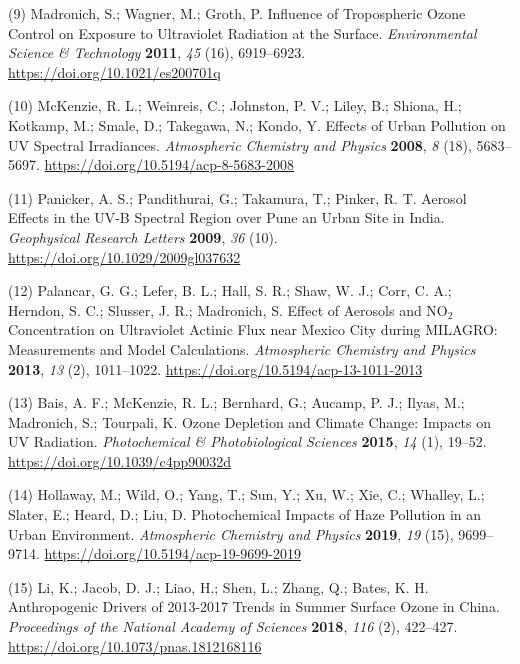 \documentclass[10pt]{article}
\begin{document}
\label{csl:9}(9) Madronich, S.; Wagner, M.; Groth, P. {Influence of Tropospheric Ozone Control on Exposure to Ultraviolet Radiation at the Surface}. \textit{Environmental Science {\&} Technology} \textbf{2011}, \textit{45} (16), 6919–6923. \url{https://doi.org/10.1021/es200701q}

\label{csl:10}(10) McKenzie, R. L.; Weinreis, C.; Johnston, P. V.; Liley, B.; Shiona, H.; Kotkamp, M.; Smale, D.; Takegawa, N.; Kondo, Y. {Effects of Urban Pollution on {UV} Spectral Irradiances}. \textit{Atmospheric Chemistry and Physics} \textbf{2008}, \textit{8} (18), 5683–5697. \url{https://doi.org/10.5194/acp-8-5683-2008}

\label{csl:11}(11) Panicker, A. S.; Pandithurai, G.; Takamura, T.; Pinker, R. T. {Aerosol Effects in the {UV}-B Spectral Region over Pune an Urban Site in India}. \textit{Geophysical Research Letters} \textbf{2009}, \textit{36} (10). \url{https://doi.org/10.1029/2009gl037632}

\label{csl:12}(12) Palancar, G. G.; Lefer, B. L.; Hall, S. R.; Shaw, W. J.; Corr, C. A.; Herndon, S. C.; Slusser, J. R.; Madronich, S. {Effect of Aerosols and NO$_{2}$ Concentration on Ultraviolet Actinic Flux near Mexico City during MILAGRO: Measurements and Model Calculations}. \textit{Atmospheric Chemistry and Physics} \textbf{2013}, \textit{13} (2), 1011–1022. \url{https://doi.org/10.5194/acp-13-1011-2013}

\label{csl:13}(13) Bais, A. F.; McKenzie, R. L.; Bernhard, G.; Aucamp, P. J.; Ilyas, M.; Madronich, S.; Tourpali, K. {Ozone Depletion and Climate Change: Impacts on {UV} Radiation}. \textit{Photochemical {\&} Photobiological Sciences} \textbf{2015}, \textit{14} (1), 19–52. \url{https://doi.org/10.1039/c4pp90032d}

\label{csl:14}(14) Hollaway, M.; Wild, O.; Yang, T.; Sun, Y.; Xu, W.; Xie, C.; Whalley, L.; Slater, E.; Heard, D.; Liu, D. {Photochemical Impacts of Haze Pollution in an Urban Environment}. \textit{Atmospheric Chemistry and Physics} \textbf{2019}, \textit{19} (15), 9699–9714. \url{https://doi.org/10.5194/acp-19-9699-2019}

\label{csl:15}(15) Li, K.; Jacob, D. J.; Liao, H.; Shen, L.; Zhang, Q.; Bates, K. H. {Anthropogenic Drivers of 2013-2017 Trends in Summer Surface Ozone in China}. \textit{Proceedings of the National Academy of Sciences} \textbf{2018}, \textit{116} (2), 422–427. \url{https://doi.org/10.1073/pnas.1812168116}
\end{document}
